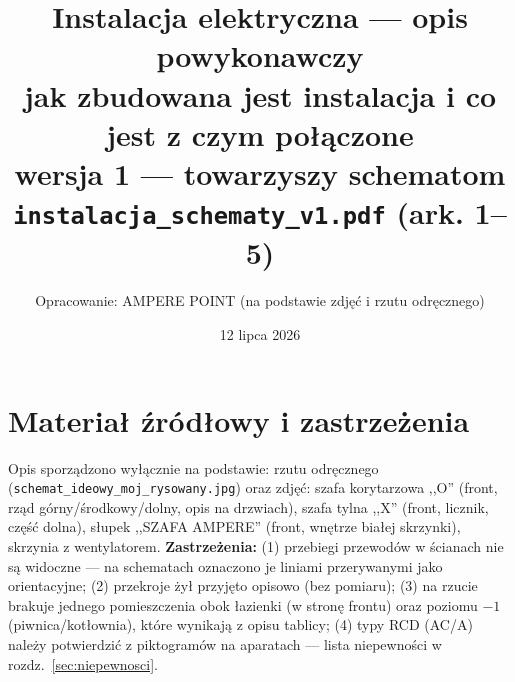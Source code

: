 \documentclass[11pt,a4paper]{article}
\title{\textbf{Instalacja elektryczna --- opis powykonawczy}\\[3pt]
\large jak zbudowana jest instalacja i co jest z czym połączone\\[2pt]
\normalsize wersja 1 --- towarzyszy schematom \texttt{instalacja\_schematy\_v1.pdf} (ark. 1--5)}
\author{Opracowanie: AMPERE POINT (na podstawie zdjęć i rzutu odręcznego)}
\date{12 lipca 2026}
\begin{document}
\maketitle
\vspace{-1.4em}

\section{Materiał źródłowy i zastrzeżenia}
Opis sporządzono wyłącznie na podstawie: rzutu odręcznego (\texttt{schemat\_ideowy\_moj\_rysowany.jpg})
oraz zdjęć: szafa korytarzowa ,,O'' (front, rząd górny/środkowy/dolny, opis na drzwiach), szafa
tylna ,,X'' (front, licznik, część dolna), słupek ,,SZAFA AMPERE'' (front, wnętrze białej skrzynki),
skrzynia z wentylatorem. \textbf{Zastrzeżenia:} (1) przebiegi przewodów w ścianach nie są widoczne
--- na schematach oznaczono je liniami przerywanymi jako orientacyjne; (2) przekroje żył przyjęto
opisowo (bez pomiaru); (3) na rzucie brakuje jednego pomieszczenia obok łazienki (w stronę frontu)
oraz poziomu $-1$ (piwnica/kotłownia), które wynikają z opisu tablicy; (4) typy RCD (AC/A) należy
potwierdzić z piktogramów na aparatach --- lista niepewności w rozdz.~\ref{sec:niepewnosci}.
\end{document}
